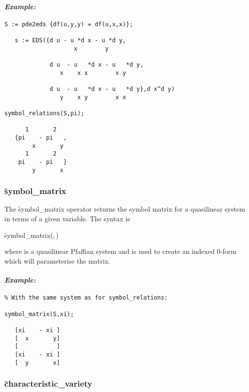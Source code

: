 \paragraph{\textit{Example:}}
\begin{verbatim}
S := pde2eds {df(u,y,y) = df(u,x,x)};

   s := EDS({d u - u *d x - u *d y,
                    x        y

             d u  - u   *d x - u   *d y,
                x    x x        x y

             d u  - u   *d x - u   *d y},d x^d y)
                y    x y        x x

symbol_relations(S,pi);

      1       2
   {pi    - pi   ,
        x       y
      1       2
    pi    - pi   }
        y       x
\end{verbatim}

\subsubsection{\f{symbol\_matrix}}
\label{symbol_matrix}

\hypertarget{operator:SYMBOL_MATRIX}{}
The \f{symbol\_matrix} operator returns the symbol matrix for a quasilinear
system in terms of a given variable. The syntax is
\begin{syntax}
  \f{symbol\_matrix}(,\,)
\end{syntax}
where  is a quasilinear Pfaffian system and  is
used to create an indexed 0-form which will parameterise the matrix.

\paragraph{\textit{Example:}}
\begin{verbatim}
% With the same system as for symbol_relations:

symbol_matrix(S,xi);

   [xi    - xi ]
   [  x       y]
   [           ]
   [xi    - xi ]
   [  y       x]
\end{verbatim}

\subsubsection{\f{characteristic\_variety}}
\label{characteristic_variety}

